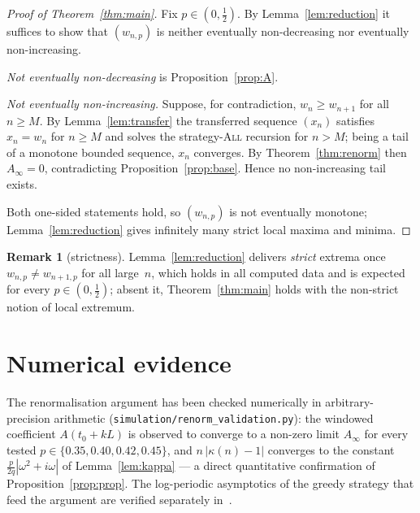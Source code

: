 \documentclass[11pt]{article}
\theoremstyle{definition}
\newtheorem{remark}[theorem]{Remark}
\newcommand{\All}{\textsc{All}}
\begin{document}
\begin{proof}[Proof of Theorem~\ref{thm:main}]
  Fix $p\in(0,\tfrac12)$. By Lemma~\ref{lem:reduction} it suffices to
  show that $(w_{n,p})$ is neither eventually non-decreasing nor
  eventually non-increasing.

  \emph{Not eventually non-decreasing} is Proposition~\ref{prop:A}.

  \emph{Not eventually non-increasing.} Suppose, for contradiction,
  $w_n\ge w_{n+1}$ for all $n\ge M$. By Lemma~\ref{lem:transfer} the
  transferred sequence $(x_n)$ satisfies $x_n=w_n$ for $n\ge M$ and
  solves the strategy-\All{} recursion for $n>M$; being a tail of a
  monotone bounded sequence, $x_n$ converges. By
  Theorem~\ref{thm:renorm} then $A_\infty=0$, contradicting
  Proposition~\ref{prop:base}. Hence no non-increasing tail exists.

  Both one-sided statements hold, so $(w_{n,p})$ is not eventually
  monotone; Lemma~\ref{lem:reduction} gives infinitely many strict
  local maxima and minima.
\end{proof}

\begin{remark}[strictness]
  Lemma~\ref{lem:reduction} delivers \emph{strict} extrema once
  $w_{n,p}\ne w_{n+1,p}$ for all large~$n$, which holds in all
  computed data and is expected for every $p\in(0,\tfrac12)$; absent
  it, Theorem~\ref{thm:main} holds with the non-strict notion of
  local extremum.
\end{remark}

\section{Numerical evidence}\label{sec:numerics}

The renormalisation argument has been checked numerically in
arbitrary-precision arithmetic
(\texttt{simulation/renorm\_validation.py}): the windowed coefficient
$A(t_0+kL)$ is observed to converge to a non-zero limit $A_\infty$ for
every tested $p\in\{0.35,0.40,0.42,0.45\}$, and $n\,|\kappa(n)-1|$
converges to the constant $\tfrac{p}{2q}|\omega^2+i\omega|$ of
Lemma~\ref{lem:kappa} --- a direct quantitative confirmation of
Proposition~\ref{prop:prop}. The log-periodic asymptotics of the
greedy strategy that feed the argument are verified separately
in~\cite{Paper2}.

\end{document}
